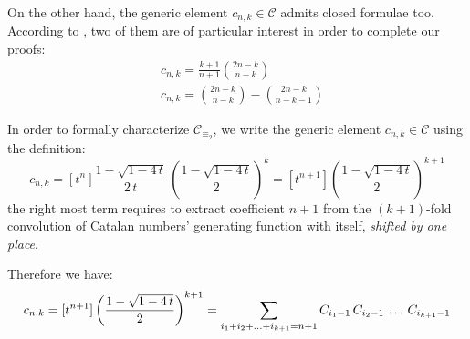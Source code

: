 On the other hand, the generic element $c_{n,k}\in\mathcal{C}$ 
admits closed formulae too. According to
\cite{luzon:2012631}, two of them are of
particular interest in order to complete our proofs:
\begin{align}
    & c_{n,k}=\frac{k+1}{n+1}{{2n-k}\choose{n-k}}
    \label{eq:catalan:array:first:identity}\\
    & c_{n,k}={{2n-k}\choose{n-k}} - {{2n-k}\choose{n-k-1}}
    \label{eq:catalan:array:second:identity}
\end{align}

In order to formally characterize $\mathcal{C}_{\equiv_{2}}$, 
we write the generic element $c_{n,k}\in\mathcal{C}$ using the definition:
\begin{displaymath}
    c_{n,k} = [t^n] \frac{1-\sqrt{1-4\,t}}{2\,t}\,
        \left(\frac{1-\sqrt{1-4\,t}}{2}\right)^{k}
           = [t^{n+1}] \left(\frac{1-\sqrt{1-4\,t}}{2}\right)^{k+1} 
\end{displaymath}
the right most term requires to extract coefficient $n+1$ from the $(k+1)$-fold
convolution of Catalan numbers' generating function with itself, \emph{shifted
by one place}. 
\iffalse
Before going on, careful understanding of what coefficients are introduced is necessary. 
The following expansion defines a sequence of coefficients 
$\lbrace \hat{c}_{i}\rbrace_{i\in\mathbb{N}}$:
\begin{displaymath}
    \frac{1-\sqrt{1-4\,t}}{2} = t + t^{2} + 2 t^{3} + 5 t^{4} 
        + 14 t^{5} + 42 t^{6} + 132 t^{7} %
        + \mathcal{O}\left(t^{8}\right)
\end{displaymath}
where $\hat{c}_{0}=0$. On the other hand the following one, defines a sequence 
of coefficients $\lbrace C_{i}\rbrace_{i\in\mathbb{N}}$, 
the traditional Catalan numbers:
\begin{displaymath}
    \frac{1-\sqrt{1-4\,t}}{2\,t} = 1 + t + 2 t^{2} + 5 t^{3} + 14 t^{4} 
        + 42 t^{5} + 132 t^{6} %
        + \mathcal{O}\left(t^{7}\right)
\end{displaymath}
so $\hat{c}_{j} = C_{j-1}$ holds for any $j\in\mathbb{N}$, 
with boundary condition $C_{-1}=0$.  Looking at the previous expression for $c_{n,k}$,
there exists indices $i_{1}, i_{2}, \ldots, i_{k+1}$,
where $i_{j}\in\lbrace0,\ldots,n+1\rbrace$ for each $j\in\lbrace1,\ldots,k+1\rbrace$, 
such that:
\fi
Therefore we have:
\begin{equation}
    \footnotesize
    c_{n,k} = [t^{n+1}] \left(\frac{1-\sqrt{1-4\,t}}{2}\right)^{k+1} 
            = \sum_{i_{1}+ i_{2}+ \ldots+ i_{k+1}=n+1}{
                C_{i_{1}-1}\,C_{i_{2}-1}\,\ldots\,C_{i_{k+1}-1} }
    \label{eq:convolution:expansion:for:generic:element:in:catalan:array}
\end{equation}

